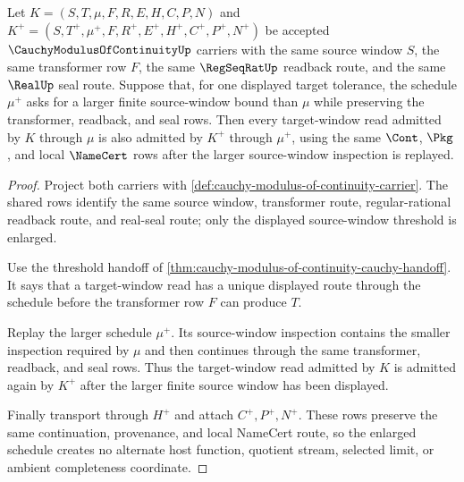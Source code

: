 \begin{theorem}
\label{thm:cauchy-modulus-of-continuity-window-monotonicity}
Let $K=(S,T,\mu,F,R,E,H,C,P,N)$ and
$K^+=(S,T^+,\mu^+,F,R^+,E^+,H^+,C^+,P^+,N^+)$ be accepted
$\CauchyModulusOfContinuityUp$ carriers with the same source window $S$,
the same transformer row $F$, the same $\RegSeqRatUp$ readback route, and
the same $\RealUp$ seal route. Suppose that, for one displayed target
tolerance, the schedule $\mu^+$ asks for a larger finite source-window bound
than $\mu$ while preserving the transformer, readback, and seal rows. Then
every target-window read admitted by $K$ through $\mu$ is also admitted by
$K^+$ through $\mu^+$, using the same $\Cont$, $\Pkg$, and local
$\NameCert$ rows after the larger source-window inspection is replayed.
\end{theorem}
\begin{proof}
Project both carriers with
\autoref{def:cauchy-modulus-of-continuity-carrier}. The shared rows identify
the same source window, transformer route, regular-rational readback route,
and real-seal route; only the displayed source-window threshold is enlarged.

Use the threshold handoff of
\autoref{thm:cauchy-modulus-of-continuity-cauchy-handoff}. It says that a
target-window read has a unique displayed route through the schedule before
the transformer row $F$ can produce $T$.

Replay the larger schedule $\mu^+$. Its source-window inspection contains the
smaller inspection required by $\mu$ and then continues through the same
transformer, readback, and seal rows. Thus the target-window read admitted by
$K$ is admitted again by $K^+$ after the larger finite source window has been
displayed.

Finally transport through $H^+$ and attach $C^+,P^+,N^+$. These rows preserve
the same continuation, provenance, and local NameCert route, so the enlarged
schedule creates no alternate host function, quotient stream, selected limit,
or ambient completeness coordinate.
\end{proof}

